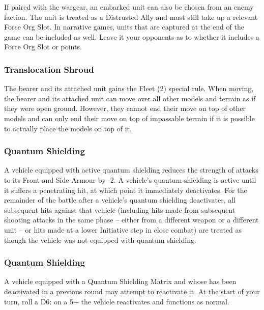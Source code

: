 If paired with the  wargear, an embarked unit can also be chosen from an enemy faction. The unit is treated as a Distrusted Ally and must still take up a relevant Force Org Slot. In narrative games, units that are captured at the end of the game can be included as well. Leave it your opponents as to whether it includes a Force Org Slot or points.

\subsubsection{Translocation Shroud} \label{Translocation Shroud}

The bearer and its attached unit gains the Fleet (2) special rule. When moving, the bearer and its attached unit can move over all other models and terrain as if they were open ground. However, they cannot end their move on top of other models and can only end their move on top of impassable terrain if it is possible to actually place the models on top of it.

\subsubsection{Quantum Shielding} \label{Quantum Shielding}

A vehicle equipped with active quantum shielding reduces the strength of attacks to its Front and Side Armour by -2. A vehicle’s quantum shielding is active until it suffers a penetrating hit, at which point it immediately
deactivates. For the remainder of the battle after a vehicle’s quantum shielding deactivates, all subsequent hits against that vehicle (including hits made from subsequent shooting attacks in the same phase – either
from a different weapon or a different unit – or hits made at a lower Initiative step in close combat) are treated as though the vehicle was not equipped with quantum shielding.

\subsubsection{Quantum Shielding} \label{Quantum Shielding Matrix}

A vehicle equipped with a Quantum Shielding Matrix and  whose  has been deactivated in a previous round may attempt to reactivate it. At the start of your turn, roll a D6: on a 5+ the vehicle  reactivates and functions as normal.

